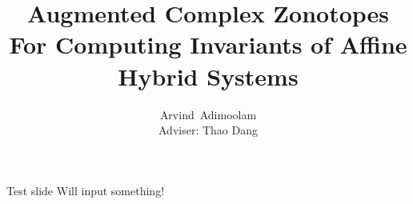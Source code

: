 


%





\title{Augmented Complex Zonotopes For Computing Invariants of Affine Hybrid Systems}
\author[shortname]{{  Arvind\ Adimoolam\\[0.5em]
{\small Adviser: Thao Dang}}}

\date{}


\maketitle

\begin{frame}{Test slide}
Will input something!
\end{frame}








